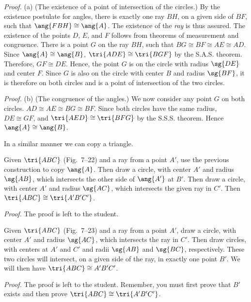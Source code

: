 \documentclass[11pt]{book}
\theoremstyle{bkplain}
\theoremstyle{XIplainnote}
\theoremstyle{bkplain}
\theoremstyle{bkplain}
\begin{document}
\noindent\emph{Proof.} (a)\quad
(The existence of a point of intersection of the circles.) By the existence
postulate for angles, there is exactly one ray $BH$, on a given side of $BF$,
such that $\ang{FBH} \cong \ang{A}$. The existence of the \emph{ray} is thus
assured. The existence of the points $D$, $E$, and $F$ follows from theorems of
measurement and congruence. There is a point $G$ on the ray $BH$, such that
$BG \cong BF \cong AE \cong AD$. Since $\ang{A} \cong \ang{B}$,
$\tri{ADE} \cong \tri{BGF}$ by the S.A.S. theorem. Therefore,
$GF \cong DE$. Hence, the point $G$ is on the circle with radius $\sg{DE}$ and
center $F$. Since $G$ is also on the circle with center $B$ and radius
$\sg{BF}$, it is therefore on both circles and is a point of intersection of
the two circles.

\noindent\emph{Proof.} (b)\quad
(The congruence of the angles.) We now consider any point $G$ on both circles.
$AD \cong AE \cong BG \cong BF$. Since both circles have the same radius,
$DE \cong GF$, and $\tri{AED} \cong \tri{BFG}$ by the S.S.S. theorem. Hence
$\ang{A} \cong \ang{B}$.

In a similar manner we can copy a triangle.

\begin{construction}
Given $\tri{ABC}$ (Fig.~7--22) and a ray from a point $A'$, use the previous
construction to copy $\ang{A}$. Then draw a circle, with center $A'$ and radius
$\sg{AB}$, which intersects the other side of $\ang{A'}$ at $B'$. Then draw a
circle, with center $A'$ and radius $\sg{AC}$, which intersects the given ray
in $C'$. Then $\tri{ABC} \cong \tri{A'B'C'}$.
\end{construction}

\noindent\emph{Proof.}\quad
The proof is left to the student.

\FIGVIITWENTYTWOTWENTYTHREE

\begin{construction}
Given $\tri{ABC}$ (Fig.~7--23) and a ray from a point $A'$, draw a circle, with
center $A'$ and radius $\sg{AC}$, which intersects the ray in $C'$. Then draw
circles, with centers at $A'$ and $C'$ and radii $\sg{AB}$ and $\sg{BC}$,
respectively. These two circles will intersect, on a given side of the ray, in
exactly one point $B'$. We will then have $\tri{ABC} \cong A'B'C'$.
\end{construction}

\noindent\emph{Proof.}\quad
The proof is left to the student. Remember, you must first prove that $B'$
exists and then prove $\tri{ABC} \cong \tri{A'B'C'}$.
\end{document}
